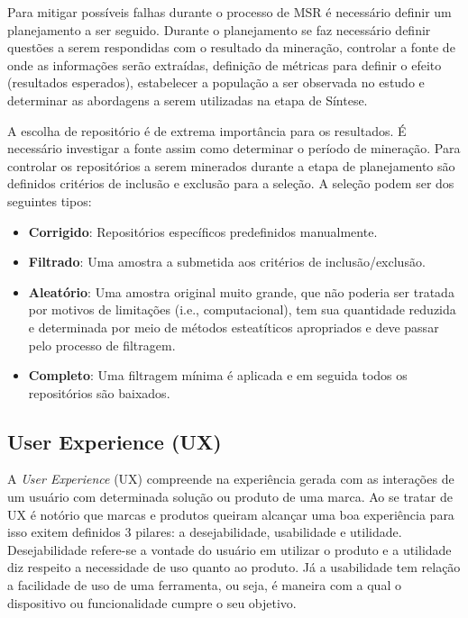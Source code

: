 \documentclass[12pt]{article}
\begin{document}
Para mitigar possíveis falhas durante o processo de MSR é necessário definir um planejamento a ser seguido. Durante o planejamento se faz necessário definir questões a serem respondidas com o resultado da mineração, controlar a fonte de onde as informações serão extraídas, definição de métricas para definir o efeito (resultados esperados), estabelecer a população a ser observada no estudo e determinar as abordagens a serem utilizadas na etapa de Síntese.

A escolha de repositório é de extrema importância para os resultados. É necessário investigar a fonte assim como determinar o período de mineração. Para controlar os repositórios a serem minerados durante a etapa de planejamento são definidos critérios de inclusão e exclusão para a seleção. A seleção podem ser dos seguintes tipos:

\begin{itemize}
    \item \textbf{Corrigido}: Repositórios específicos predefinidos manualmente.
    \item \textbf{Filtrado}: Uma amostra a submetida aos critérios de inclusão/exclusão.
    \item \textbf{Aleatório}: Uma amostra original muito grande, que não poderia ser tratada por motivos de limitações (i.e., computacional), tem sua quantidade reduzida e determinada por meio de métodos esteatíticos apropriados e deve passar pelo processo de filtragem.
    \item \textbf{Completo}: Uma filtragem mínima é aplicada e em seguida todos os repositórios são baixados.
\end{itemize}

\subsection{User Experience (UX)}
A \textit{User Experience} (UX) compreende na experiência gerada com as interações de um usuário com determinada solução ou produto de uma marca. Ao se tratar de UX é notório que marcas e produtos queiram alcançar uma boa experiência para isso exitem definidos 3 pilares: a desejabilidade, usabilidade e utilidade. Desejabilidade refere-se a vontade do usuário em utilizar o produto e a utilidade diz respeito a necessidade de uso quanto ao produto. Já a usabilidade tem relação a facilidade de uso de uma ferramenta, ou seja, é maneira com a qual o dispositivo ou funcionalidade cumpre o seu objetivo.
\end{document}
